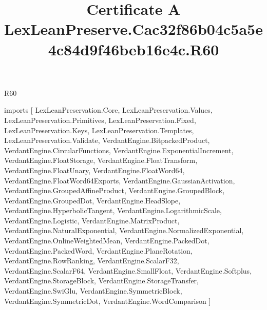 \begin{lexlean}{R60}
\title{Certificate A LexLeanPreserve.Cac32f86b04c5a5e4c84d9f46beb16e4c.R60}
\begin{coremodule}
imports [
  LexLeanPreservation.Core,
  LexLeanPreservation.Values,
  LexLeanPreservation.Primitives,
  LexLeanPreservation.Fixed,
  LexLeanPreservation.Keys,
  LexLeanPreservation.Templates,
  LexLeanPreservation.Validate,
  VerdantEngine.BitpackedProduct,
  VerdantEngine.CircularFunctions,
  VerdantEngine.ExponentialIncrement,
  VerdantEngine.FloatStorage,
  VerdantEngine.FloatTransform,
  VerdantEngine.FloatUnary,
  VerdantEngine.FloatWord64,
  VerdantEngine.FloatWord64Exports,
  VerdantEngine.GaussianActivation,
  VerdantEngine.GroupedAffineProduct,
  VerdantEngine.GroupedBlock,
  VerdantEngine.GroupedDot,
  VerdantEngine.HeadSlope,
  VerdantEngine.HyperbolicTangent,
  VerdantEngine.LogarithmicScale,
  VerdantEngine.Logistic,
  VerdantEngine.MatrixProduct,
  VerdantEngine.NaturalExponential,
  VerdantEngine.NormalizedExponential,
  VerdantEngine.OnlineWeightedMean,
  VerdantEngine.PackedDot,
  VerdantEngine.PackedWord,
  VerdantEngine.PlaneRotation,
  VerdantEngine.RowRanking,
  VerdantEngine.ScalarF32,
  VerdantEngine.ScalarF64,
  VerdantEngine.SmallFloat,
  VerdantEngine.Softplus,
  VerdantEngine.StorageBlock,
  VerdantEngine.StorageTransfer,
  VerdantEngine.SwiGlu,
  VerdantEngine.SymmetricBlock,
  VerdantEngine.SymmetricDot,
  VerdantEngine.WordComparison
]


\end{coremodule}
\end{lexlean}
